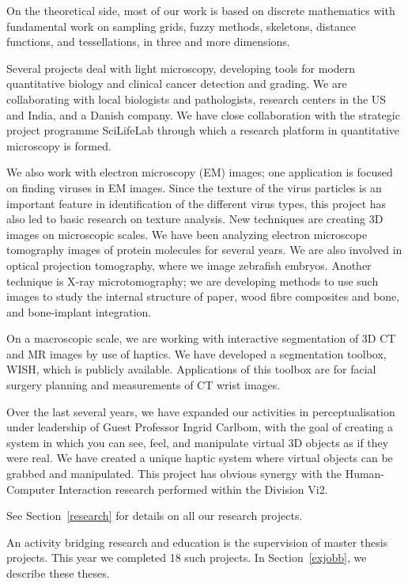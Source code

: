 On the theoretical side, most of our work is based on discrete mathematics with fundamental work on sampling grids, fuzzy methods, skeletons, distance functions, and tessellations, in three and more dimensions.

Several projects deal with light microscopy, developing tools for modern quantitative biology and clinical cancer detection and grading. We are collaborating with local biologists and pathologists, research centers in the US and India, and a Danish company. We have close collaboration with the strategic project programme SciLifeLab through which a research platform in quantitative microscopy is formed. 

We also work with electron microscopy (EM) images; one application is focused on finding viruses in EM images. Since the texture of the virus particles is an important feature in identification of the different virus types, this project has also led to basic research on texture analysis. 
\clearpage
New techniques are creating 3D images on microscopic scales. We have been analyzing electron microscope tomography images of protein molecules for several years. We are also involved in optical projection tomography, where we image zebrafish embryos. Another technique is X-ray microtomography; we are developing methods to use such images to study the internal structure of paper, wood fibre composites and bone, and bone-implant integration. 

On a macroscopic scale, we are working with interactive segmentation of 3D CT and MR images by use of haptics. We have developed a segmentation toolbox, WISH, which is publicly available. Applications of this toolbox are for facial surgery planning and measurements of CT wrist images. 

Over the last several years, we have expanded our activities in perceptualisation under leadership of Guest Professor Ingrid Carlbom, with the goal of creating a system in which you can see, feel, and manipulate virtual 3D objects as if they were real. 
 We have created a unique haptic system where virtual objects can be grabbed and manipulated. This project has obvious synergy with the Human-Computer Interaction research performed within the Division Vi2. 

See Section~\ref{research} for details on all our research projects.

An activity bridging research and education is the supervision of master thesis projects. This year we completed 18 such projects. In Section~\ref{exjobb}, we describe these theses.

